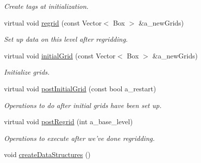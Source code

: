 \begin{DoxyCompactItemize}
\begin{DoxyCompactList}\small\item\em Create tags at initialization. \end{DoxyCompactList}\item 
\hypertarget{class_a_m_r_level_mushy_layer_a92be42a12813c7e9bebb3ab6f025616f}{virtual void \hyperlink{class_a_m_r_level_mushy_layer_a92be42a12813c7e9bebb3ab6f025616f}{regrid} (const Vector$<$ Box $>$ \&a\-\_\-new\-Grids)}\label{class_a_m_r_level_mushy_layer_a92be42a12813c7e9bebb3ab6f025616f}

\begin{DoxyCompactList}\small\item\em Set up data on this level after regridding. \end{DoxyCompactList}\item 
\hypertarget{class_a_m_r_level_mushy_layer_adc885cc04926a87b4c4f97e3803fc749}{virtual void \hyperlink{class_a_m_r_level_mushy_layer_adc885cc04926a87b4c4f97e3803fc749}{initial\-Grid} (const Vector$<$ Box $>$ \&a\-\_\-new\-Grids)}\label{class_a_m_r_level_mushy_layer_adc885cc04926a87b4c4f97e3803fc749}

\begin{DoxyCompactList}\small\item\em Initialize grids. \end{DoxyCompactList}\item 
\hypertarget{class_a_m_r_level_mushy_layer_a7d430606668cadfa432d81d521d5cf79}{virtual void \hyperlink{class_a_m_r_level_mushy_layer_a7d430606668cadfa432d81d521d5cf79}{post\-Initial\-Grid} (const bool a\-\_\-restart)}\label{class_a_m_r_level_mushy_layer_a7d430606668cadfa432d81d521d5cf79}

\begin{DoxyCompactList}\small\item\em Operations to do after initial grids have been set up. \end{DoxyCompactList}\item 
\hypertarget{class_a_m_r_level_mushy_layer_a9b299b200bf4fadfb4ad7221177d4585}{virtual void \hyperlink{class_a_m_r_level_mushy_layer_a9b299b200bf4fadfb4ad7221177d4585}{post\-Regrid} (int a\-\_\-base\-\_\-level)}\label{class_a_m_r_level_mushy_layer_a9b299b200bf4fadfb4ad7221177d4585}

\begin{DoxyCompactList}\small\item\em Operations to execute after we've done regridding. \end{DoxyCompactList}\item 
\hypertarget{class_a_m_r_level_mushy_layer_a6763c8a7fef3e4f0c5da3c90df096e98}{void \hyperlink{class_a_m_r_level_mushy_layer_a6763c8a7fef3e4f0c5da3c90df096e98}{create\-Data\-Structures} ()}\label{class_a_m_r_level_mushy_layer_a6763c8a7fef3e4f0c5da3c90df096e98}


\end{DoxyCompactItemize}
